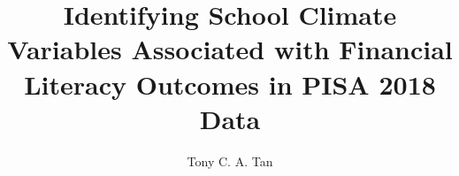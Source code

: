 \documentclass[a4paper,11pt,stu]{MAE4090}
\title{Identifying School Climate Variables Associated with Financial Literacy Outcomes in PISA 2018 Data}
\author{Tony C. A. Tan}
\begin{document}
\makemaetitle



%

%

%

%


\end{document}
